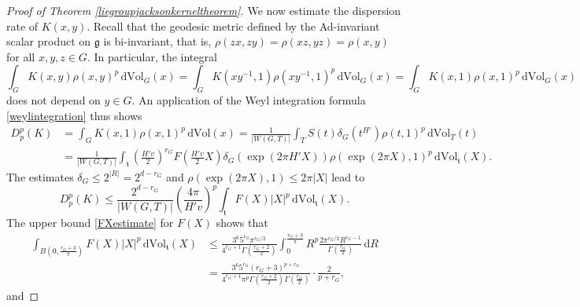 \documentclass[11pt,a4paper]{article}
\theoremstyle{definition}
\begin{document}
\begin{proof}[Proof of Theorem \ref{liegroupjacksonkerneltheorem}]
We now estimate the dispersion rate of $K(x,y)$. Recall that the geodesic metric defined by the Ad-invariant scalar product on $\mathfrak{g}$ is bi-invariant, that is, $\rho (zx,zy)=\rho (xz,yz)=\rho (x,y)$ for all $x,y,z \in G$. In particular, the integral
\[ \int_G K(x,y) \rho (x,y)^p \, \mathrm{d}\mathrm{Vol}_G(x) = \int_G K(xy^{-1},1) \rho (xy^{-1},1)^p \, \mathrm{d}\mathrm{Vol}_G(x) = \int_G K(x,1) \rho (x,1)^p \, \mathrm{d}\mathrm{Vol}_G(x) \]
does not depend on $y \in G$. An application of the Weyl integration formula \eqref{weylintegration} thus shows
\[ \begin{split} D_p^p(K) &= \int_G K(x,1) \rho (x,1)^p \, \mathrm{d}\mathrm{Vol}(x) = \frac{1}{|W(G,T)|} \int_T S(t) \delta_G (t^{H'}) \rho (t,1)^p \, \mathrm{d}\mathrm{Vol}_T (t) \\ &= \frac{1}{|W(G,T)|} \int_{\mathfrak{t}} \left( \frac{H' v}{2} \right)^{r_G} F \left( \frac{H' v}{2} X \right) \delta_G (\exp (2 \pi H' X)) \rho (\exp (2 \pi X), 1)^p \, \mathrm{d}\mathrm{Vol}_{\mathfrak{t}}(X) . \end{split} \]
The estimates $\delta_G \le 2^{|R|}=2^{d-r_G}$ and $\rho (\exp (2 \pi X), 1) \le 2 \pi |X|$ lead to
\begin{equation}\label{Dppreliminary}
D_p^p (K) \le \frac{2^{d-r_G}}{|W(G,T)|} \left( \frac{4 \pi}{H' v} \right)^p \int_{\mathfrak{t}} F(X) |X|^p \, \mathrm{d} \mathrm{Vol}_{\mathfrak{t}}(X) .
\end{equation}
The upper bound \eqref{FXestimate} for $F(X)$ shows that
\[ \begin{split} \int_{B\left( 0, \frac{r_G+3}{\pi} \right)} F(X) |X|^p \, \mathrm{d}\mathrm{Vol}_{\mathfrak{t}}(X) &\le \frac{3^6 5^{r_G} \pi^{r_G /2}}{4^{r_G +1} \Gamma \left( \frac{r_G +2}{2} \right)} \int_0^{\frac{r_G+3}{\pi}} R^p \frac{2 \pi^{r_G/2}R^{r_G-1}}{\Gamma \left( \frac{r_G}{2} \right)} \, \mathrm{d}R \\ &= \frac{3^6 5^{r_G} (r_G+3)^{p+r_G}}{4^{r_G+1} \pi^p \Gamma \left( \frac{r_G+2}{2} \right) \Gamma \left( \frac{r_G}{2} \right)} \cdot \frac{2}{p+r_G}, \end{split} \]
and

\end{proof}
\end{document}
